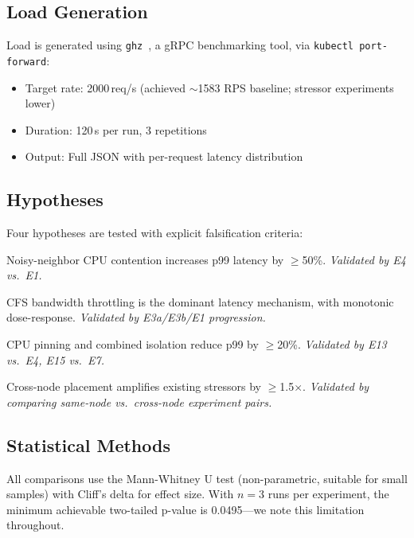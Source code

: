 \documentclass[11pt,a4paper]{article}
\begin{document}
\subsection{Load Generation}

Load is generated using \texttt{ghz}~\cite{ghz2023}, a gRPC benchmarking tool, via \texttt{kubectl port-forward}:
\begin{itemize}[leftmargin=*]
  \item Target rate: 2000\,req/s (achieved $\sim$1583 RPS baseline; stressor experiments lower)
  \item Duration: 120\,s per run, 3 repetitions
  \item Output: Full JSON with per-request latency distribution
\end{itemize}

\subsection{Hypotheses}

Four hypotheses are tested with explicit falsification criteria:

\begin{description}[leftmargin=*]
  \item[H1 (CPU Contention):] Noisy-neighbor CPU contention increases p99 latency by $\geq$50\%. \emph{Validated by E4 vs.\ E1.}

  \item[H2 (CFS Throttling):] CFS bandwidth throttling is the dominant latency mechanism, with monotonic dose-response. \emph{Validated by E3a/E3b/E1 progression.}

  \item[H3 (Mitigation):] CPU pinning and combined isolation reduce p99 by $\geq$20\%. \emph{Validated by E13 vs.\ E4, E15 vs.\ E7.}

  \item[H4 (Cross-Node Amplification):] Cross-node placement amplifies existing stressors by $\geq$1.5$\times$. \emph{Validated by comparing same-node vs.\ cross-node experiment pairs.}
\end{description}

\subsection{Statistical Methods}

All comparisons use the Mann-Whitney U test (non-parametric, suitable for small samples) with Cliff's delta for effect size. With $n=3$ runs per experiment, the minimum achievable two-tailed p-value is 0.0495---we note this limitation throughout.
\end{document}
